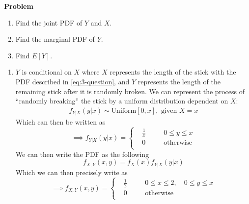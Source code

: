 \documentclass[12pt]{article}
\newenvironment{Ex}{\textbf{Problem}\vspace{.75em}\\}{}
\begin{document}
\begin{enumerate}
\begin{Ex}
    \begin{enumerate}
    \item Find the joint PDF of $Y$ and $X$.
    \item Find the marginal PDF of $Y$.
    \item Find $E[Y]$.
    \end{enumerate}
    \begin{solution} \hfill
      \begin{enumerate}
      \item $Y$ is conditional on $X$ where $X$ represents the length
        of the stick with the PDF described in \cref{eq:3-question},
        and $Y$ represents the length of the remaining stick after it
        is randomly broken. We can represent the process of ``randomly
        breaking'' the stick by a uniform distribution dependent on
        $X$:
        \begin{equation}
          \label{eq:3a-y-given-x-dist}
          \begin{aligned}
            f_{Y|X}(y|x) \sim \text{Uniform}[0,x], \text{ given } X = x
          \end{aligned}
        \end{equation}
        Which can then be written as
        \begin{equation}
          \label{eq:3a-y-given-x-pdf}
          \implies f_{Y|X}(y|x) = \left\{
            \begin{aligned}
              & \frac{1}{x} &&\quad 0 \le y \le x \\
              & 0 &&\quad \text{otherwise} \\
            \end{aligned} \right.
        \end{equation}
        We can then write the PDF as the following
        \begin{equation}
          \label{eq:3a-presol}
            f_{X,Y}(x,y) = f_X(x)f_{Y|X}(y|x)
        \end{equation}
        Which we can then precisely write as
        \begin{equation}
          \label{eq:3a-sol}
          \implies f_{X,Y}(x,y) = \left\{
            \begin{aligned}
              & \frac{1}{2} &&\quad 0 \le x \le 2,
              \quad 0 \le y \le x \\
              & 0 &&\quad\text{otherwise} \\
            \end{aligned} \right.

\end{equation}
\end{enumerate}
\end{solution}
\end{Ex}
\end{enumerate}
\end{document}
